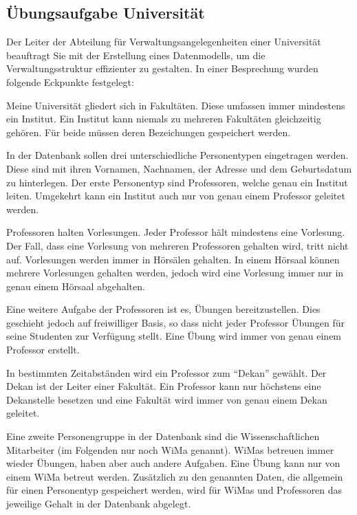       \subsection{\"Ubungsaufgabe Universit\"at}
        Der Leiter der Abteilung f\"ur Verwaltungsangelegenheiten einer
        Universit\"at beauftragt Sie mit der Erstellung eines Datenmodells, um
        die Verwaltungsstruktur effizienter zu gestalten. In einer Besprechung
        wurden folgende Eckpunkte festgelegt:

        Meine Universit\"at gliedert sich in Fakult\"aten. Diese umfassen immer
        mindestens ein Institut. Ein Institut kann niemals zu mehreren
        Fakult\"aten gleichzeitig geh\"oren. F\"ur beide m\"ussen deren
        Bezeichungen gespeichert werden.

        In der Datenbank sollen drei unterschiedliche Personentypen eingetragen
        werden. Diese sind mit ihren Vornamen, Nachnamen, der Adresse und dem
        Geburtsdatum zu hinterlegen. Der erste Personentyp sind Professoren,
        welche genau ein Institut leiten. Umgekehrt kann ein Institut auch nur
        von genau einem Professor geleitet werden.

        Professoren halten Vorlesungen. Jeder Professor h\"alt mindestens eine
        Vorlesung. Der Fall, dass eine Vorlesung von mehreren Professoren
        gehalten wird, tritt nicht auf. Vorlesungen werden immer in
        H\"ors\"alen gehalten. In einem H\"orsaal k\"onnen mehrere Vorlesungen
        gehalten werden, jedoch wird eine Vorlesung immer nur in genau einem
        H\"orsaal abgehalten.

        Eine weitere Aufgabe der Professoren ist es, \"Ubungen bereitzustellen.
        Dies geschieht jedoch auf freiwilliger Basis, so dass nicht jeder
        Professor \"Ubungen f\"ur seine Studenten zur Verf\"ugung stellt. Eine
        \"Ubung wird immer von genau einem Professor erstellt.

        In bestimmten Zeitabst\"anden wird ein Professor zum \enquote{Dekan}
        gew\"ahlt. Der Dekan ist der Leiter einer Fakult\"at. Ein Professor kann
        nur h\"ochstens eine Dekanstelle besetzen und eine Fakult\"at wird immer
        von genau einem Dekan geleitet.

        Eine zweite Personengruppe in der Datenbank sind die Wissenschaftlichen
        Mitarbeiter (im Folgenden nur noch WiMa genannt). WiMas betreuen immer
        wieder \"Ubungen, haben aber auch andere Aufgaben. Eine \"Ubung kann nur
        von einem WiMa betreut werden. Zus\"atzlich zu den genannten Daten, die
        allgemein f\"ur einen Personentyp gespeichert werden, wird f\"ur WiMas
        und Professoren das jeweilige Gehalt in der Datenbank abgelegt.

